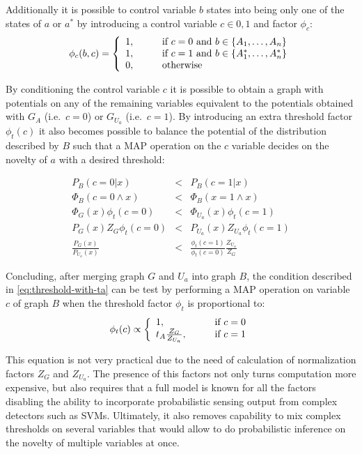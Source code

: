 Additionally it is possible to control variable $b$ states into being only one
of the states of $a$ or $a^*$ by introducing a control variable $c \in {0, 1}$
and factor $\phi_{c}$:
\[
\phi_{c}(b, c) = \left\{
  \begin{array}{l l}
    1, & \qquad \text{if } c = 0 \text{ and } b \in \{A_1,\dotsc,A_n\} \\
    1, & \qquad \text{if } c = 1 \text{ and } b \in \{A^*_1,\dotsc,A^*_n\}\\
    0, & \qquad \text{otherwise}
  \end{array} \right.
\]

By conditioning the control variable $c$ it is possible to obtain a graph with
potentials on any of the remaining variables equivalent to the potentials
obtained with $G_A$ (i.e.\ $c=0$) or $G_{U_a}$ (i.e.\ $c=1$). By introducing
an extra threshold factor $\phi_t(c)$ it also becomes possible to balance the
potential of the distribution described by $B$ such that a \gls{MAP} operation
on the $c$ variable decides on the novelty of $a$ with a desired threshold:

\begin{eqnarray*}
 P_B(c=0 | x)         &<& P_B(c=1 | x) \\
\Phi_B(c=0 \land x)   &<& \Phi_B(x=1 \land x) \\
\Phi_G(x) \phi_t(c=0) &<& \Phi_{U_a}(x) \phi_t(c=1) \\
P_G(x) Z_G \phi_t(c=0) &<& P_{U_a}(x) Z_{U_a} \phi_t(c=1) \\
\frac{P_G(x)}{P_{U_a}(x)} &<& \frac{\phi_t(c=1)}{\phi_t(c=0)}\frac{Z_{U_a}}{Z_G}
\end{eqnarray*}

Concluding, after merging graph $G$ and $U_a$ into graph $B$, the condition
described in \autoref{eq:threshold-with-ta} can be test by performing a
\gls{MAP} operation on variable $c$ of graph $B$ when the threshold factor
$\phi_t$ is proportional to:
\begin{equation}
\phi_t(c) \propto \left\{
  \begin{array}{l l}
    1, & \qquad \text{if } c = 0 \\
    t_A \frac{Z_G}{Z_{U_a}}, & \qquad \text{if } c = 1\\
  \end{array} \right.
\end{equation}

This equation is not very practical due to the need of calculation of
normalization factors $Z_G$ and $Z_{U_a}$. The presence of this factors
not only turns computation more expensive, but also requires that a full model
is known for all the factors disabling the ability to incorporate probabilistic
sensing output from complex detectors such as \glspl{SVM}. Ultimately, it also
removes capability to mix complex thresholds on several variables that would
allow to do probabilistic inference on the novelty of multiple variables at once.

